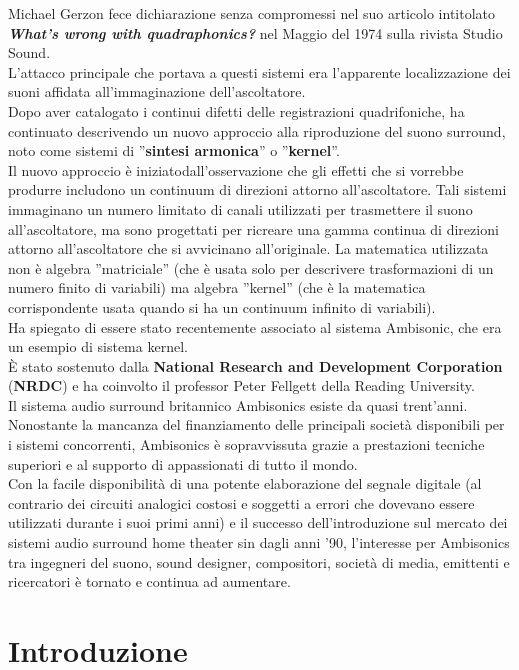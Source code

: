 Michael Gerzon fece dichiarazione senza compromessi nel suo articolo intitolato
\textit{\textbf{What’s wrong with quadraphonics?}} nel Maggio del 1974 sulla rivista Studio Sound.\\
L’attacco principale che portava a questi sistemi era l’apparente localizzazione dei
suoni affidata all’immaginazione dell’ascoltatore.\\
Dopo aver catalogato i continui difetti delle registrazioni quadrifoniche, ha
continuato descrivendo un nuovo approccio alla riproduzione del suono surround,
noto come sistemi di ”\textbf{sintesi armonica}” o ”\textbf{kernel}”.\\
 Il nuovo approccio è iniziatodall’osservazione che gli effetti che si vorrebbe produrre includono un continuum
di direzioni attorno all’ascoltatore. Tali sistemi immaginano un numero
limitato di canali utilizzati per trasmettere il suono all’ascoltatore, ma sono progettati
per ricreare una gamma continua di direzioni attorno all’ascoltatore che
si avvicinano all’originale. La matematica utilizzata non è algebra ”matriciale”
(che è usata solo per descrivere trasformazioni di un numero finito di variabili)
ma algebra ”kernel” (che è la matematica corrispondente usata quando si ha un
continuum infinito di variabili).\\
Ha spiegato di essere stato recentemente associato al sistema Ambisonic, che
era un esempio di sistema kernel.\\ È stato sostenuto dalla \textbf{National Research and
Development Corporation} (\textbf{NRDC}) e ha coinvolto il professor Peter Fellgett della
Reading University.\\
Il sistema audio surround britannico Ambisonics esiste da quasi trent’anni.\\
Nonostante la mancanza del finanziamento delle principali società disponibili
per i sistemi concorrenti, Ambisonics è sopravvissuta grazie a prestazioni tecniche
superiori e al supporto di appassionati di tutto il mondo.\\
Con la facile disponibilità di una potente elaborazione del segnale digitale
 (al contrario dei circuiti analogici costosi e soggetti a errori che dovevano essere utilizzati durante i suoi primi anni)
 e il successo dell'introduzione sul mercato dei sistemi audio surround home theater sin dagli anni '90,
  l'interesse per Ambisonics tra ingegneri del suono, sound designer, compositori, società di media,
  emittenti e ricercatori è tornato e continua ad aumentare.

  \section{Introduzione}

